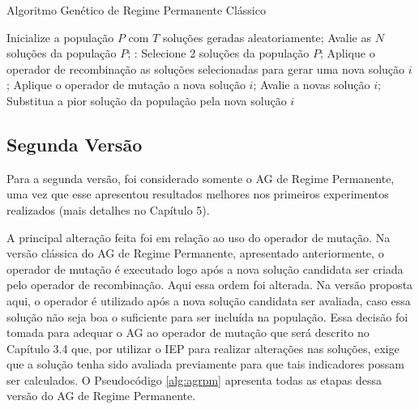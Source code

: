 \begin{algorithm}[H]
  \caption{Algoritmo Genético de Regime Permanente Clássico}
  \label{alg:agrpc}
  \begin{algorithmic}
    \State Inicialize a população $P$ com $T$ soluções geradas aleatoriamente;
    \State Avalie as $N$ soluções da população $P$;
       \State:
        \State Selecione 2 soluções da população $P$;
        \State Aplique o operador de recombinação as soluções selecionadas para gerar uma nova solução $i$;
        \State Aplique o operador de mutação a nova solução $i$;
        \State Avalie a novas solução $i$;
          \State Substitua a pior solução da população pela nova solução $i$	
        \EndIf
      \EndFor
    \EndWhile
  \end{algorithmic}
\end{algorithm}

\subsection{Segunda Versão}

Para a segunda versão, foi considerado somente o AG de Regime Permanente, uma vez que esse apresentou resultados melhores nos primeiros experimentos realizados (mais detalhes no Capítulo 5). 

A principal alteração feita foi em relação ao uso do operador de mutação. Na versão clássica do AG de Regime Permanente, apresentado anteriormente, o operador de mutação é executado logo após a nova solução candidata ser criada pelo operador de recombinação. Aqui essa ordem foi alterada. Na versão proposta aqui, o operador é utilizado após a nova solução candidata ser avaliada, caso essa solução não seja boa o suficiente para ser incluída na população. Essa decisão foi tomada para adequar o AG ao operador de mutação que será descrito no Capítulo 3.4 que, por utilizar o IEP para realizar alterações nas soluções, exige que a solução tenha sido avaliada previamente para que tais indicadores possam ser calculados. O Pseudocódigo \ref{alg:agrpm} apresenta todas as etapas dessa versão do AG de Regime Permanente.

